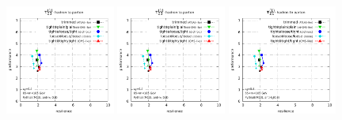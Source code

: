 \documentclass[11pt,letterpaper]{article}
\begin{document}
\begin{figure}
  \includegraphics[width=0.32\textwidth,page=29]{figures/grooming-scan-levels.pdf}
  \hfill
  \includegraphics[width=0.32\textwidth,page=17]{figures/grooming-scan-levels.pdf}
  \hfill
  \includegraphics[width=0.32\textwidth,page=35]{figures/grooming-scan-levels.pdf}
  \caption{}\label{fig:grooming-ATLAS}
\end{figure}
\end{document}
